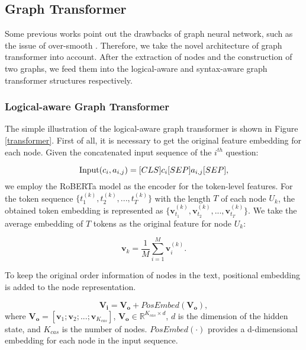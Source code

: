 \documentclass[sigconf]{acmart}
\begin{document}
\subsection{Graph Transformer}
Some previous works \cite{zhang2020graph, dwivedi2020generalization} point out the drawbacks of graph neural network, such as the issue of over-smooth \cite{li2018deeper}. Therefore, we take the novel architecture of graph transformer \cite{ying2021transformers, cai2020graph} into account. After the extraction of nodes and the construction of two graphs, we feed them into the logical-aware and syntax-aware graph transformer structures respectively. 

\subsubsection{\textbf{Logical-aware Graph Transformer}}
The simple illustration of the logical-aware graph transformer is shown in Figure \ref{transformer}. First of all, it is necessary to get the original feature embedding for each node. Given the concatenated input sequence of the $i^{th}$ question:

\begin{equation}
	{\rm Input}(c_{i},a_{i, j}) = [C L S] c_{i} [S E P] a_{i, j} [S E P],
\end{equation}
we employ the RoBERTa model \cite{liu2019roberta} as the encoder for the token-level features. For the token sequence $\{t_{1}^{(k)}, t_{2}^{(k)},..., t_{T}^{(k)}\}$ with the length $T$ of each node $U_{k}$, the obtained token embedding is represented as $\{\mathbf{v}_{t_{1}}^{(k)}, \mathbf{v}_{t_{2}}^{(k)},..., \mathbf{v}_{t_{T}}^{(k)}\}$. We take the average embedding of $T$ tokens as the original feature for node $U_{k}$:

\begin{equation}
	\mathbf{v}_{k} = \frac{1}{M}\sum\limits_{i = 1}^M {\mathbf{v}_i^{(k)}}. 
\end{equation}

To keep the original order information of nodes in the text, positional embedding is added to the node representation.

\begin{equation}
	\mathbf{V_{i}} = \mathbf{V_{o}} + PosEmbed(\mathbf{V_{o}}),
\end{equation}
where $\mathbf{V_{o}} = [\mathbf{v}_{1}; \mathbf{v}_{2}; ... ; \mathbf{v}_{K_{cas}}]$, $\mathbf{V_{o}} \in \mathbb{R}^{K_{cas}\times d}$, $d$ is the dimension of the hidden state, and $K_{cas}$ is the number of nodes. $PosEmbed(\cdot)$ provides a d-dimensional embedding for each node in the input sequence.
\end{document}

